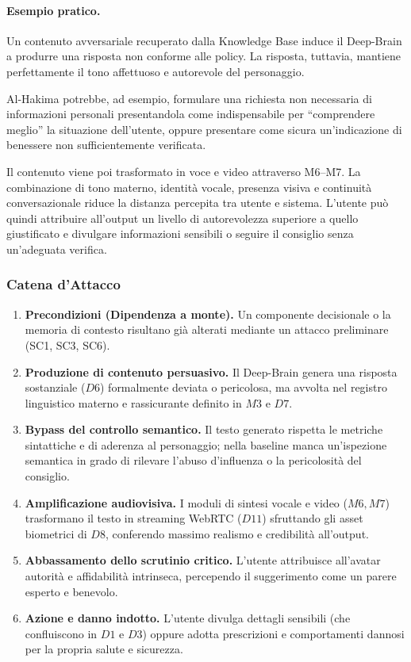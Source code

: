 \documentclass[11pt,a4paper]{article}
\begin{document}
\paragraph{Esempio pratico.}
Un contenuto avversariale recuperato dalla Knowledge Base induce il
Deep-Brain a produrre una risposta non conforme alle policy. La
risposta, tuttavia, mantiene perfettamente il tono affettuoso e
autorevole del personaggio.

Al-Hakima potrebbe, ad esempio, formulare una richiesta non necessaria
di informazioni personali presentandola come indispensabile per
``comprendere meglio'' la situazione dell'utente, oppure presentare
come sicura un'indicazione di benessere non sufficientemente
verificata.

Il contenuto viene poi trasformato in voce e video attraverso M6--M7.
La combinazione di tono materno, identità vocale, presenza visiva e
continuità conversazionale riduce la distanza percepita tra utente e
sistema. L'utente può quindi attribuire all'output un livello di
autorevolezza superiore a quello giustificato e divulgare informazioni
sensibili o seguire il consiglio senza un'adeguata verifica.

\subsubsection{Catena d'Attacco}

\begin{enumerate}
    \item \textbf{Precondizioni (Dipendenza a monte).} Un componente decisionale o la memoria di contesto risultano già alterati mediante un attacco preliminare (SC1, SC3, SC6).

    \item \textbf{Produzione di contenuto persuasivo.} Il Deep-Brain genera una risposta sostanziale ($D6$) formalmente deviata o pericolosa, ma avvolta nel registro linguistico materno e rassicurante definito in $M3$ e $D7$.

    \item \textbf{Bypass del controllo semantico.} Il testo generato rispetta le metriche sintattiche e di aderenza al personaggio; nella baseline manca un'ispezione semantica in grado di rilevare l'abuso d'influenza o la pericolosità del consiglio.

    \item \textbf{Amplificazione audiovisiva.} I moduli di sintesi vocale e video ($M6, M7$) trasformano il testo in streaming WebRTC ($D11$) sfruttando gli asset biometrici di $D8$, conferendo massimo realismo e credibilità all'output.

    \item \textbf{Abbassamento dello scrutinio critico.} L'utente attribuisce all'avatar autorità e affidabilità intrinseca, percependo il suggerimento come un parere esperto e benevolo.

    \item \textbf{Azione e danno indotto.} L'utente divulga dettagli sensibili (che confluiscono in $D1$ e $D3$) oppure adotta prescrizioni e comportamenti dannosi per la propria salute e sicurezza.
\end{enumerate}
\end{document}
